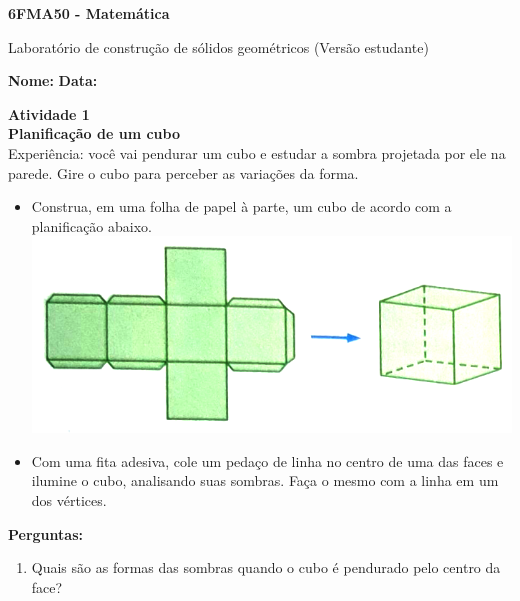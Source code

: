 \documentclass[a4paper,14pt]{article}
\begin{document}
	
	\noindent\textbf{6FMA50 - Matemática} 
	
	\begin{center}Laboratório de construção de sólidos geométricos (Versão estudante)
	\end{center}
	
	\noindent\textbf{Nome:} \underline{\hspace{10cm}}
	\noindent\textbf{Data:} \underline{\hspace{4cm}}
	
	
	
    \begin{multicols}{2}
    	\noindent \textbf{Atividade 1}\\
    	\textbf{Planificação de um cubo}\\
    	Experiência: você vai pendurar um cubo e estudar a sombra projetada por ele na parede. Gire o cubo para perceber as variações da forma.
    	\begin{itemize}
    		\item Construa, em uma folha de papel à parte, um cubo de acordo com a planificação abaixo. \\
    		\includegraphics[width=1\linewidth]{imagens_6FMA50/imagem1}
    		\item Com uma fita adesiva, cole um pedaço de linha no centro de uma das faces e ilumine o cubo, analisando suas sombras. Faça o mesmo com a linha em um dos vértices.    		
    	\end{itemize}
        \textbf{Perguntas:}
    	\begin{enumerate}
    		\item Quais são as formas das sombras quando o cubo é pendurado pelo centro da face? \\\\\\\\\\\\\\\\

\end{enumerate}
\end{multicols}
\end{document}

